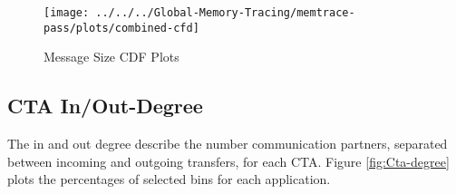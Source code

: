 \begin{figure}[t]
	\texttt{[image: ../../../Global-Memory-Tracing/memtrace-pass/plots/combined-cfd]}
	\caption{Message Size CDF Plots}
	\label{fig:CDF}
\end{figure}


\subsection{CTA In/Out-Degree}
The in and out degree describe the number  communication partners, separated between incoming and outgoing transfers, for each CTA. Figure \ref{fig:Cta-degree} plots the percentages of selected bins for each application. 

